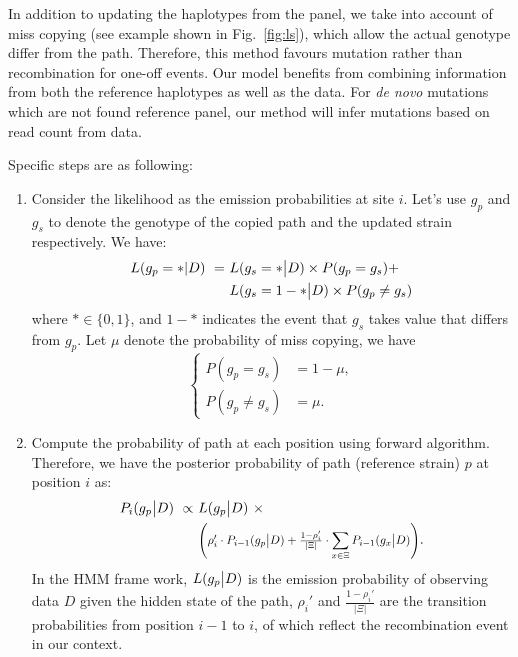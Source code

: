 \documentclass{bioinfo}
\newcommand*{\Scale}[2][4]{\scalebox{#1}{$#2$}}%
\begin{document}
In addition to updating the haplotypes from the panel, we take into account of miss copying (see example shown in Fig.~\ref{fig:ls}), which allow the actual genotype differ from the path. Therefore, this method favours mutation rather than recombination for one-off events. Our model benefits from combining information from both the reference haplotypes as well as the data. For {\em de novo} mutations which are not found reference panel, our method will infer mutations based on read count from data.

Specific steps are as following:
\begin{enumerate}
\item Consider the likelihood as the emission probabilities at site $i$. Let's use $g_p$ and $g_s$ to denote the genotype of the copied path and the updated strain respectively. We have:
\begin{equation*}
\begin{split}
L(g_p = * | D) ~ = ~ & L(g_s = * \big{|} D) \times P(g_p = g_s) + \\
                     & L(g_s = 1 - * \big{|} D) \times P(g_p \neq g_s) \label{eqn:gp_given_D}
\end{split}
\end{equation*}
where $*\in \{0,1\}$, and $1-*$ indicates the event that $g_s$ takes value that differs from $g_p$. Let $\mu$ denote the probability of miss copying, we have
$$\begin{cases}
P(g_p = g_s) &= 1-\mu, \\
P(g_p \neq g_s) &= \mu .\end{cases}$$

\item Compute the probability of path at each position using forward algorithm. Therefore, we have the posterior probability of path (reference strain) $p$ at position $i$ as:
\begin{equation}
\begin{split}
P_i(g_p \big{|} D) ~ \propto ~ & L(g_p \big{|} D) ~ \times \\
                               & \Scale[0.85]{\left( \rho_i' \cdot P_{i-1}(g_p \big{|} D)  +  \frac{1-\rho_i'}{|\Xi|} \cdot \displaystyle\sum_{x\in \Xi} P_{i-1} (g_x \big{|} D) \right)}.
\end{split}\label{eqn:post_path}
\end{equation}
In the HMM frame work, $L(g_p \big{|} D)$ is the emission probability of observing data $D$ given the hidden state of the path, $\rho_i'$ and $\frac{1-\rho_i'}{|\Xi|}$ are the transition probabilities from position $i-1$ to $i$, of which reflect the recombination event in our context.


\end{enumerate}
\end{document}
